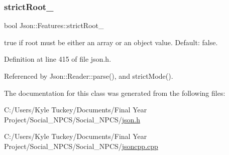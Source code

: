 \subsubsection{\texorpdfstring{strict\+Root\+\_\+}{strictRoot\_}}
{\footnotesize\ttfamily bool Json\+::\+Features\+::strict\+Root\+\_\+}

{\ttfamily true} if root must be either an array or an object value. Default\+: {\ttfamily false}. 

Definition at line 415 of file json.\+h.



Referenced by Json\+::\+Reader\+::parse(), and strict\+Mode().



The documentation for this class was generated from the following files\+:\begin{DoxyCompactItemize}
\item 
C\+:/\+Users/\+Kyle Tuckey/\+Documents/\+Final Year Project/\+Social\+\_\+\+N\+P\+C\+S/\+Social\+\_\+\+N\+P\+C\+S/\hyperlink{json_8h}{json.\+h}\item 
C\+:/\+Users/\+Kyle Tuckey/\+Documents/\+Final Year Project/\+Social\+\_\+\+N\+P\+C\+S/\+Social\+\_\+\+N\+P\+C\+S/\hyperlink{jsoncpp_8cpp}{jsoncpp.\+cpp}\end{DoxyCompactItemize}
